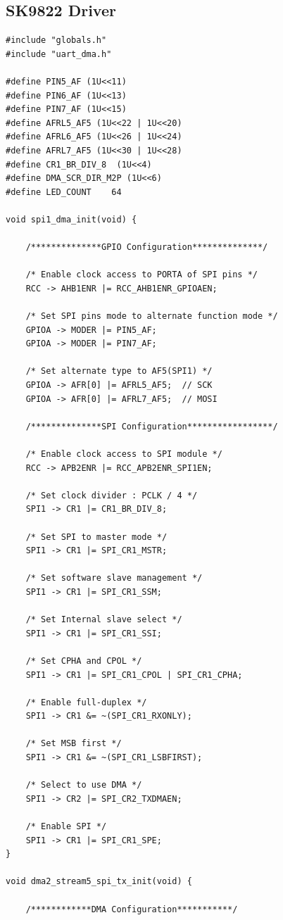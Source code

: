 \documentclass[12pt]{article}
\numberwithin{subsubsubsection}{subsubsection}
\begin{document}
\subsection{SK9822 Driver}

\begin{verbatim}
#include "globals.h"
#include "uart_dma.h"

#define PIN5_AF (1U<<11)
#define PIN6_AF (1U<<13)
#define PIN7_AF (1U<<15)
#define AFRL5_AF5 (1U<<22 | 1U<<20)
#define AFRL6_AF5 (1U<<26 | 1U<<24)
#define AFRL7_AF5 (1U<<30 | 1U<<28)
#define CR1_BR_DIV_8  (1U<<4)
#define DMA_SCR_DIR_M2P (1U<<6)
#define LED_COUNT    64

void spi1_dma_init(void) {

    /**************GPIO Configuration**************/
    
    /* Enable clock access to PORTA of SPI pins */
    RCC -> AHB1ENR |= RCC_AHB1ENR_GPIOAEN;

    /* Set SPI pins mode to alternate function mode */
    GPIOA -> MODER |= PIN5_AF;
    GPIOA -> MODER |= PIN7_AF;

    /* Set alternate type to AF5(SPI1) */
    GPIOA -> AFR[0] |= AFRL5_AF5;  // SCK
    GPIOA -> AFR[0] |= AFRL7_AF5;  // MOSI
    
    /**************SPI Configuration*****************/
    
    /* Enable clock access to SPI module */
    RCC -> APB2ENR |= RCC_APB2ENR_SPI1EN;

    /* Set clock divider : PCLK / 4 */
    SPI1 -> CR1 |= CR1_BR_DIV_8; 

    /* Set SPI to master mode */
    SPI1 -> CR1 |= SPI_CR1_MSTR;

    /* Set software slave management */
    SPI1 -> CR1 |= SPI_CR1_SSM;

    /* Set Internal slave select */
    SPI1 -> CR1 |= SPI_CR1_SSI;

    /* Set CPHA and CPOL */
    SPI1 -> CR1 |= SPI_CR1_CPOL | SPI_CR1_CPHA;

    /* Enable full-duplex */
    SPI1 -> CR1 &= ~(SPI_CR1_RXONLY);

    /* Set MSB first */
    SPI1 -> CR1 &= ~(SPI_CR1_LSBFIRST);

    /* Select to use DMA */
    SPI1 -> CR2 |= SPI_CR2_TXDMAEN;

    /* Enable SPI */
    SPI1 -> CR1 |= SPI_CR1_SPE;
}

void dma2_stream5_spi_tx_init(void) {
	
    /************DMA Configuration***********/
    

\end{verbatim}
\end{document}
